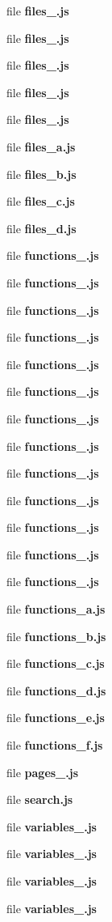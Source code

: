 \begin{DoxyCompactItemize}
file {\bf files\-\_.\-js}
\item 
file {\bf files\-\_.\-js}
\item 
file {\bf files\-\_.\-js}
\item 
file {\bf files\-\_.\-js}
\item 
file {\bf files\-\_.\-js}
\item 
file {\bf files\-\_\-a.\-js}
\item 
file {\bf files\-\_\-b.\-js}
\item 
file {\bf files\-\_\-c.\-js}
\item 
file {\bf files\-\_\-d.\-js}
\item 
file {\bf functions\-\_.\-js}
\item 
file {\bf functions\-\_.\-js}
\item 
file {\bf functions\-\_.\-js}
\item 
file {\bf functions\-\_.\-js}
\item 
file {\bf functions\-\_.\-js}
\item 
file {\bf functions\-\_.\-js}
\item 
file {\bf functions\-\_.\-js}
\item 
file {\bf functions\-\_.\-js}
\item 
file {\bf functions\-\_.\-js}
\item 
file {\bf functions\-\_.\-js}
\item 
file {\bf functions\-\_.\-js}
\item 
file {\bf functions\-\_.\-js}
\item 
file {\bf functions\-\_.\-js}
\item 
file {\bf functions\-\_\-a.\-js}
\item 
file {\bf functions\-\_\-b.\-js}
\item 
file {\bf functions\-\_\-c.\-js}
\item 
file {\bf functions\-\_\-d.\-js}
\item 
file {\bf functions\-\_\-e.\-js}
\item 
file {\bf functions\-\_\-f.\-js}
\item 
file {\bf pages\-\_.\-js}
\item 
file {\bf search.\-js}
\item 
file {\bf variables\-\_.\-js}
\item 
file {\bf variables\-\_.\-js}
\item 
file {\bf variables\-\_.\-js}
\item 
file {\bf variables\-\_.\-js}

\end{DoxyCompactItemize}
